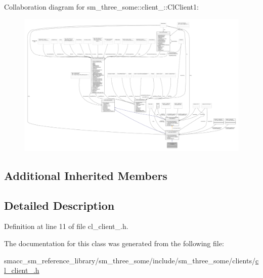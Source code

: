Collaboration diagram for sm\+\_\+three\+\_\+some\+:\+:client\+\_\+:\+:Cl\+Client1\+:
\nopagebreak
\begin{figure}[H]
\begin{center}
\leavevmode
\includegraphics[width=350pt]{classsm__three__some_1_1client__1_1_1ClClient1__coll__graph}
\end{center}
\end{figure}
\subsection*{Additional Inherited Members}


\subsection{Detailed Description}


Definition at line 11 of file cl\+\_\+client\+\_.\+h.



The documentation for this class was generated from the following file\+:\begin{DoxyCompactItemize}
\item 
smacc\+\_\+sm\+\_\+reference\+\_\+library/sm\+\_\+three\+\_\+some/include/sm\+\_\+three\+\_\+some/clients/\hyperlink{cl__client__1_8h}{cl\+\_\+client\+\_.\+h}\end{DoxyCompactItemize}
